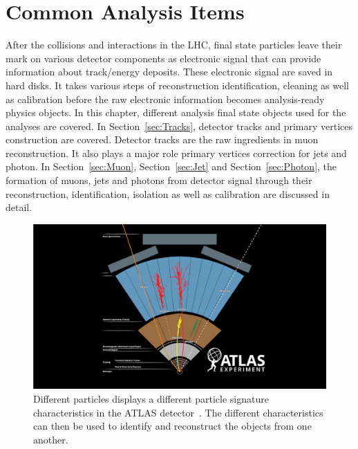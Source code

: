 \chapter{Common Analysis Items}
\label{chapter:CommonAnalysisItems}

After the collisions and interactions in the LHC, final state particles leave their mark on various detector components as electronic signal that can provide information about track/energy deposits. These electronic signal are saved in hard disks. It takes various steps of reconstruction identification, cleaning as well as calibration before the raw electronic information becomes analysis-ready physics objects. 
In this chapter, different analysis final state objects used for the analyses are covered. In Section~\ref{sec:Tracks}, detector tracks and primary vertices construction are covered. Detector tracks are the raw ingredients in muon reconstruction. It also plays a major role primary vertices correction for jets and photon. In Section~\ref{sec:Muon}, Section~\ref{sec:Jet} and Section~\ref{sec:Photon}, the formation of muons, jets and photons from detector signal
through their reconstruction, identification, isolation as well as calibration are discussed in detail. 

\begin{figure}[!htb]
    \begin{center}
        \includegraphics[width=1.1\textwidth]{figures/common_ana/ParticleSignature}
        \caption{        
            Different particles displays a different particle signature characteristics in the ATLAS detector~\cite{Mehlhase:2770815}. The different characteristics can then be used to identify and reconstruct the objects from one another. 
        }
        \label{fig:isolationWP}
    \end{center}
\end{figure}

